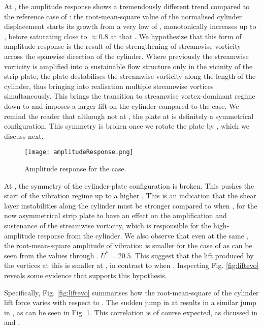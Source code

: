 \documentclass[a4paper]{article}
\begin{document}
At \ptlt{} \es{} \rze{}, the amplitude response shows a tremendously different trend compared to the reference case of \ptlt{} \es{} \rfo{}: the root-mean-square value of the normalised cylinder displacement \yrms{} starts its growth from a very low \ured{} of \urfo{}, monotonically increases up to \ured{} \es{} \urei{}, before saturating close to \yrms{} $\approx 0.8$ at that \ured{}. We hypothesize that this form of amplitude response is  the result of the strengthening of streamwise vorticity across the spanwise direction of the cylinder. Where previously the streamwise vorticity is amplified into a sustainable flow structure only in the vicinity of the strip plate, the \rze{} plate destabilises the streamwise vorticity along the length of the cylinder, thus bringing into realisation multiple streamwise vortices simultaneously. This brings the transition to streamwise vortex-dominant regime down to \ured{} \es{} \urfo{} and imposes a larger lift on the cylinder compared to the \rfo{} case. We remind the reader that although not at \rfo{}, the plate at \rze{} is definitely a symmetrical configuration. This symmetry is broken once we rotate the plate by \ron{}, which we discuss next.

\begin{figure}[h]
  \centering
  \texttt{[image: amplitudeResponse.png]}
  \caption{Amplitude response for the \rze{} case.}
  \label{fig:ampresp}
\end{figure}

At \ptlt{} \es{} \ron{}, the symmetry of the cylinder-plate configuration is broken. This pushes the start of the vibration regime up to a higher \ured{} \es{} \urni{}. This is an indication that the shear layer instabilities along the cylinder must be stronger compared to when \ptlt{} \es{} \rze{}, for the now asymmetrical strip plate to have an effect on the amplification and sustenance of the streamwise vorticity, which is responsible for the high-amplitude response from the cylinder. We also observe that even at the same \ured{}, the root-mean-square amplitude of vibration is smaller for the case of \ron{} as can be seen from the \yrms{} values \ured{} \es{} \urni{} through \urtt{}. $U^{*}=20.5$. This suggest that the lift produced by the vortices at this \ptlt{} is smaller at \ron{}, in contrast to when \ptlt{} \es{} \rze{}. Inspecting Fig. \ref{fig:liftevo} reveals some evidence that supports this hypothesis.

Specifically, Fig. \ref{fig:liftevo} summarises how the root-mean-square of the cylinder lift force varies with respect to \ured{}. The sudden jump in \flrms{} at \ured{} \es{} \urni{} results in a similar jump in \yrms{}, as can be seen in Fig. \ref{fig:ampresp}. This correlation is of course expected, as dicussed in \textcite{Raghavan2007} and \textcite{Bernitsas2008}.
\end{document}
